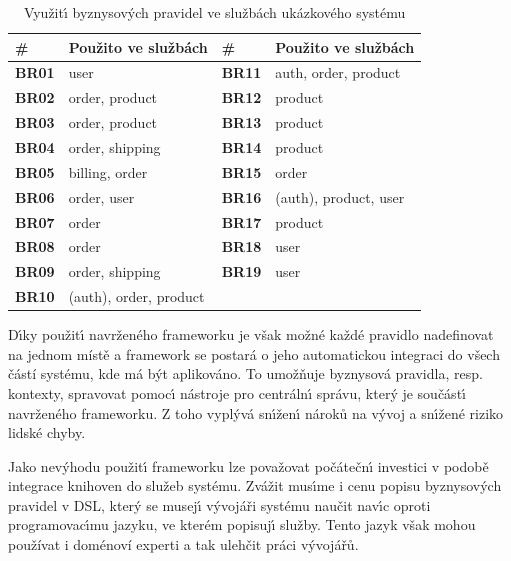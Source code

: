 \begin{table}
    \centering
    \begin{tabularx}{\textwidth}{ l X | l X }
        \hline
        \textbf{\#} & \textbf{Použito ve službách} & \textbf{\#} & \textbf{Použito ve službách} \\ \hline \hline
        \textbf{BR01} & user & \textbf{BR11} & auth, order, product \\
        \textbf{BR02} & order, product & \textbf{BR12} & product \\
        \textbf{BR03} & order, product & \textbf{BR13} & product \\
        \textbf{BR04} & order, shipping & \textbf{BR14} & product \\
        \textbf{BR05} & billing, order & \textbf{BR15} & order \\
        \textbf{BR06} & order, user & \textbf{BR16} & (auth), product, user \\
        \textbf{BR07} & order & \textbf{BR17} & product \\
        \textbf{BR08} & order & \textbf{BR18} & user \\
        \textbf{BR09} & order, shipping & \textbf{BR19} & user \\
        \textbf{BR10} & (auth), order, product & \\
        \hline
    \end{tabularx}
    \caption{Využit\'{\i} byznysov\'ych pravidel ve službách ukázkového systému}
    \label{tbl:duplication}
\end{table}

D\'{\i}ky použit\'{\i} navrženého frameworku je však možné každé pravidlo nadefinovat na jednom místě
a framework se postará o jeho automatickou integraci do všech částí systému, kde má být aplikováno.
To umožňuje byznysová pravidla, resp. kontexty, spravovat pomoc\'{\i} nástroje pro
centráln\'{\i} správu, kter\'y je součást\'{\i} navrženého frameworku. Z toho vypl\'yvá
sn\'{\i}žen\'{\i} nároků na v\'yvoj a sn\'{\i}žené riziko lidské chyby.

Jako nev\'yhodu použit\'{\i} frameworku lze považovat počátečn\'{\i} investici v podobě integrace knihoven do služeb systému.
Zvážit mus\'{\i}me i cenu popisu byznysov\'ych pravidel v \gls{DSL}, kter\'y se musej\'{\i} v\'yvojáři systému naučit nav\'{\i}c
oproti programovac\'{\i}mu jazyku, ve kterém popisuj\'{\i} služby. Tento jazyk však mohou používat i doménoví experti a tak
ulehčit práci vývojářů.

